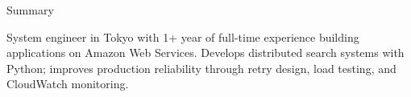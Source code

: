 \begin{rSection}{Summary}

    {System engineer in Tokyo with 1+ year of full-time experience building applications on Amazon Web Services. Develops distributed search systems with Python; improves production reliability through retry design, load testing, and CloudWatch monitoring.}
    \vspace{-5pt}
\end{rSection}
